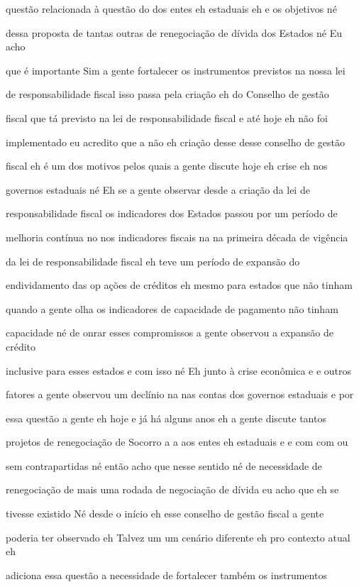 \documentclass[a4paper,12pt]{article}
\begin{document}
questão relacionada à questão do dos entes eh estaduais eh e os objetivos né

dessa proposta de tantas outras de renegociação de dívida dos Estados né Eu acho

que é importante Sim a gente fortalecer os instrumentos previstos na nossa lei

de responsabilidade fiscal isso passa pela criação eh do Conselho de gestão

fiscal que tá previsto na lei de responsabilidade fiscal e até hoje eh não foi

implementado eu acredito que a não eh criação desse desse conselho de gestão

fiscal eh é um dos motivos pelos quais a gente discute hoje eh crise eh nos

governos estaduais né Eh se a gente observar desde a criação da lei de

responsabilidade fiscal os indicadores dos Estados passou por um período de

melhoria contínua no nos indicadores fiscais na na primeira década de vigência

da lei de responsabilidade fiscal eh teve um período de expansão do

endividamento das op ações de créditos eh mesmo para estados que não tinham

quando a gente olha os indicadores de capacidade de pagamento não tinham

capacidade né de onrar esses compromissos a gente observou a expansão de crédito

inclusive para esses estados e com isso né Eh junto à crise econômica e e outros

fatores a gente observou um declínio na nas contas dos governos estaduais e por

essa questão a gente eh hoje e já há alguns anos eh a gente discute tantos

projetos de renegociação de Socorro a a aos entes eh estaduais e e com com ou

sem contrapartidas né então acho que nesse sentido né de necessidade de

renegociação de mais uma rodada de negociação de dívida eu acho que eh se

tivesse existido Né desde o início eh esse conselho de gestão fiscal a gente

poderia ter observado eh Talvez um um cenário diferente eh pro contexto atual eh

adiciona essa questão a necessidade de fortalecer também os instrumentos
\end{document}

